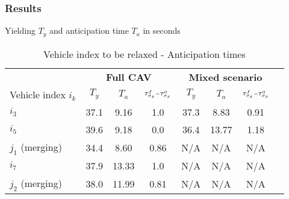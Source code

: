 
\begin{frame}
  \frametitle{Results}
  Yielding $T_y$ and anticipation time $T_a$ in seconds
  \begin{table}[bth]
    \begin{threeparttable}
      \begin{tabularx}{\textwidth}{@{}l*{7}{c}@{}}
        \toprule
        &
        \multicolumn{3}{c}{\bfseries Full CAV} &
        \multicolumn{3}{c}{\bfseries Mixed scenario}\\ %
        \cmidrule(lr){2-4} \cmidrule(lr){5-7}  %
        Vehicle index \(i_k\) & 
        \multicolumn{1}{L}{\( T_y\)} & 
        \multicolumn{1}{L}{\( T_a\)} & 
        \multicolumn{1}{L}{\(\scriptscriptstyle {T}^{f}_{\sigma_x} - {T}^{0}_{\sigma_x}\)} & 
        \multicolumn{1}{L}{\( T_y\)} & 
        \multicolumn{1}{L}{\( T_a\)} & 
        \multicolumn{1}{L}{\(\scriptscriptstyle {T}^{f}_{\sigma_x} - {T}^{0}_{\sigma_x}\)}\\  %
        \midrule
        $i_3$ & 37.1 & 9.16 & 1.0 & 37.3 & 8.83 & 0.91\\
        $i_5$ & 39.6 & 9.18 & 0.0 & 36.4 & 13.77 & 1.18 \\
        $j_1$ (merging) & 34.4 & 8.60 & 0.86 & N/A & N/A & N/A\\
        $i_7$ & 37.9 & 13.33 & 1.0 & N/A & N/A & N/A\\
        $j_2$ (merging) & 38.0 & 11.99 & 0.81 & N/A & N/A & N/A\\
        \bottomrule
      \end{tabularx}
      \caption{Vehicle index to be relaxed - Anticipation times}
    \end{threeparttable}
  \end{table}
\end{frame}

